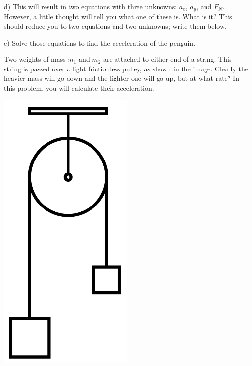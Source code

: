 \documentclass[12pt]{article}
\begin{document}
		\vspace{3in}

		
		d) This will result in two equations with three unknowns: $a_x$, $a_y$, and $F_N$. However, a little thought will
		tell you what one of these is. What is it? This should reduce you to two equations and two unknowns; write them below.
		
		\vspace{2in}
		
		e) Solve those equations to find the acceleration of the penguin.
		
		\vspace{2in}
%		
		
		\newpage
		\begin{minipage}{0.7\textwidth}
			Two weights of mass $m_1$ and $m_2$ are attached to either end of a string. This string is passed over a light frictionless pulley, as shown in the image.
			Clearly the heavier mass will go down and the lighter one will go up, but at what rate? In this problem, you will calculate their acceleration.
		\end{minipage} \hfill
		\begin{minipage}{0.3\textwidth}
			\begin{center}\includegraphics[width=0.5\textwidth]{atwood.png}
			\end{center}
		\end{minipage} \hfill
		
\end{document}
